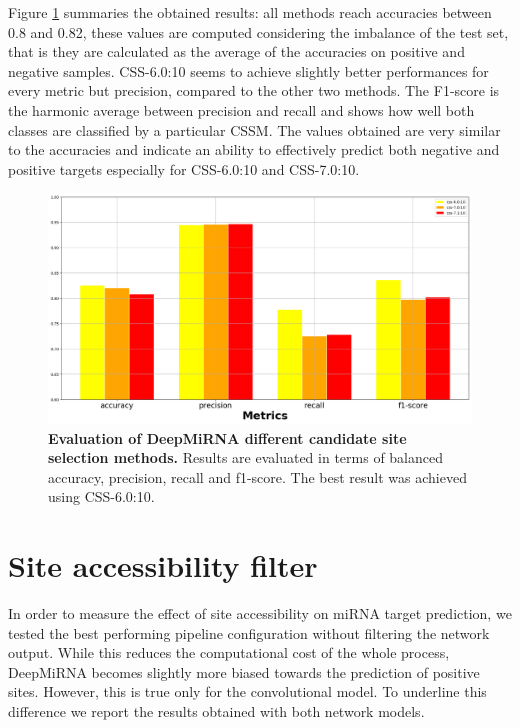 Figure \ref{fig:cssm} summaries the obtained results: all methods reach accuracies between 0.8 and 0.82, these values are computed considering the imbalance of the test set, that is they are calculated as the average of the accuracies on positive and negative samples. CSS-6.0:10 seems to achieve slightly better performances for every metric but precision, compared to the other two methods. The F1-score is the harmonic average between precision and recall and shows how well both classes are classified by a particular CSSM. The values obtained are very similar to the accuracies and indicate an ability to effectively predict both negative and positive targets especially for CSS-6.0:10 and CSS-7.0:10.

\begin{figure}[hbt!]
	\centering
	\includegraphics[width=\textwidth]{Figures/cssm_evaluation}
	\caption{\textbf{Evaluation of DeepMiRNA different candidate site selection methods.} Results are evaluated in terms of balanced accuracy, precision, recall and f1-score. The best result was achieved using CSS-6.0:10.}
	\label{fig:cssm}
\end{figure}

\section{Site accessibility filter}
In order to measure the effect of site accessibility on miRNA target prediction, we tested the best performing pipeline configuration without filtering the network output. While this reduces the computational cost of the whole process, DeepMiRNA becomes slightly more biased towards the prediction of positive sites. However, this is true only for the convolutional model. To underline this difference we report the results obtained with both network models.

